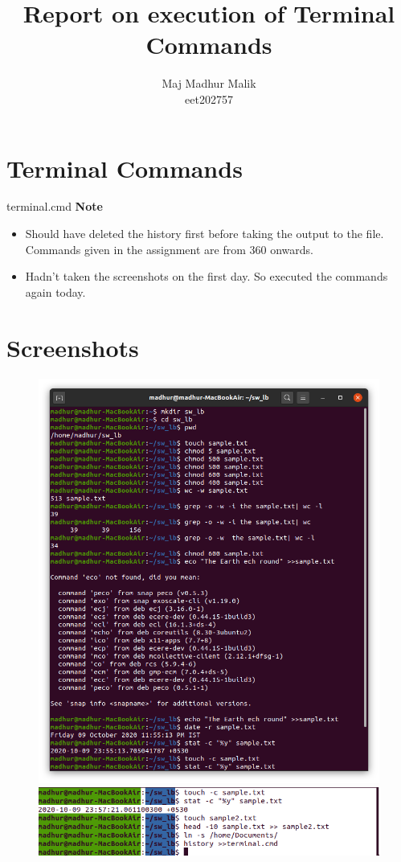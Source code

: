 \documentclass{article}
\begin{document}
	\title{Report on execution of Terminal Commands}
	\author{Maj Madhur Malik\\
	eet202757}
	\maketitle
\newpage
\tableofcontents
\newpage
\section{Terminal Commands}
 {terminal.cmd}
\textbf{Note}\\ 
\begin{itemize}
	\item Should have deleted the history first before taking the output to the file. Commands given in the assignment are from 360 onwards.
	\item Hadn't taken the screenshots on the first day. So executed the commands again today.

\end{itemize}

\newpage
\section{Screenshots}	
	\begin{figure}[H]
		\centering
		\includegraphics[scale=.5]{terminal_1.jpeg}
		\includegraphics[scale=.5]{terminal_2}
	\end{figure}
\newpage


\nocite{*}





	
\end{document}
